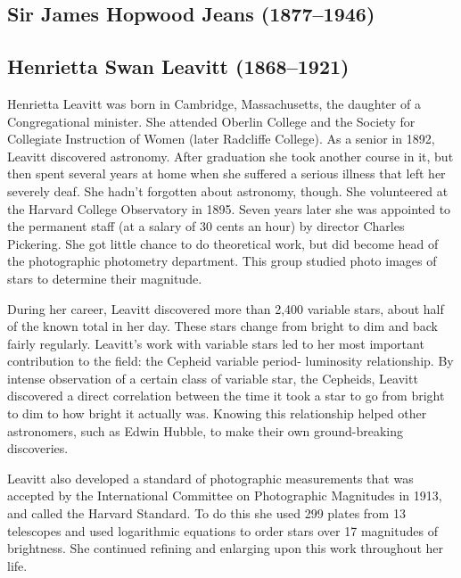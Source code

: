 \subsection[Sir James \scshape{Jeans}]{Sir James Hopwood Jeans (1877--1946)}\label{bio:jeans}

\subsection[Henrietta \scshape{Leavittt}]{Henrietta Swan Leavitt (1868--1921)}\label{bio:leavitt}
Henrietta Leavitt was born in Cambridge, Massachusetts, the daughter of a Congregational minister. She attended Oberlin College and the Society for Collegiate Instruction of Women (later Radcliffe College). As a senior in 1892, Leavitt discovered astronomy. After graduation she took another course in it, but then spent several years at home when she suffered a serious illness that left her severely deaf. She hadn't forgotten about astronomy, though. She volunteered at the Harvard College Observatory in 1895. Seven years later she was appointed to the permanent staff (at a salary of 30 cents an hour) by director Charles Pickering. She got little chance to do theoretical work, but did become head of the photographic photometry department. This group studied photo images of stars to determine their magnitude.

During her career, Leavitt discovered more than 2,400 variable stars, about half of the known total in her day. These stars change from bright to dim and back fairly regularly. Leavitt's work with variable stars led to her most important contribution to the field: the Cepheid variable period- luminosity relationship. By intense observation of a certain class of variable star, the Cepheids, Leavitt discovered a direct correlation between the time it took a star to go from bright to dim to how bright it actually was. Knowing this relationship helped other astronomers, such as Edwin Hubble, to make their own ground-breaking discoveries.

Leavitt also developed a standard of photographic measurements that was accepted by the International Committee on Photographic Magnitudes in 1913, and called the Harvard Standard. To do this she used 299 plates from 13 telescopes and used logarithmic equations to order stars over 17 magnitudes of brightness. She continued refining and enlarging upon this work throughout her life.

